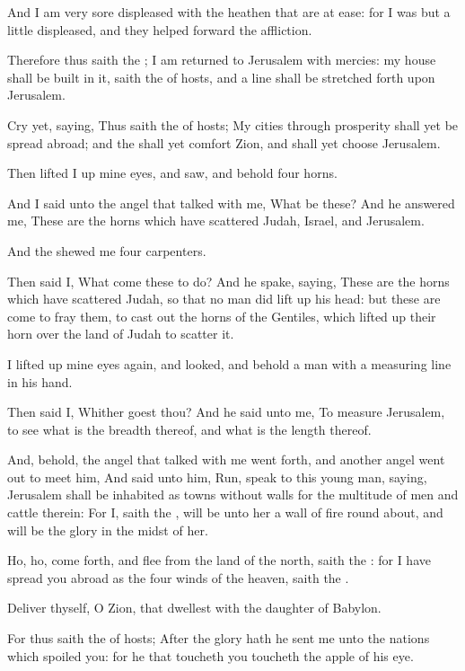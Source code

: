 \Verse And I am very sore displeased with the heathen that are at ease: for I was but a little displeased, and they helped forward the affliction.

\Verse Therefore thus saith the \LORD; I am returned to Jerusalem with mercies: my house shall be built in it, saith the \LORD of hosts, and a line shall be stretched forth upon Jerusalem.

\Verse Cry yet, saying, Thus saith the \LORD of hosts; My cities through prosperity shall yet be spread abroad; and the \LORD shall yet comfort Zion, and shall yet choose Jerusalem.

\Verse Then lifted I up mine eyes, and saw, and behold four horns.

\Verse And I said unto the angel that talked with me, What be these? And he answered me, These are the horns which have scattered Judah, Israel, and Jerusalem.

\Verse And the \LORD shewed me four carpenters.

\Verse Then said I, What come these to do? And he spake, saying, These are the horns which have scattered Judah, so that no man did lift up his head: but these are come to fray them, to cast out the horns of the Gentiles, which lifted up their horn over the land of Judah to scatter it.


\Chapter
\Verse I lifted up mine eyes again, and looked, and behold a man with a measuring line in his hand.

\Verse Then said I, Whither goest thou? And he said unto me, To measure Jerusalem, to see what is the breadth thereof, and what is the length thereof.

\Verse And, behold, the angel that talked with me went forth, and another angel went out to meet him, \Verse And said unto him, Run, speak to this young man, saying, Jerusalem shall be inhabited as towns without walls for the multitude of men and cattle therein: \Verse For I, saith the \LORD, will be unto her a wall of fire round about, and will be the glory in the midst of her.

\Verse Ho, ho, come forth, and flee from the land of the north, saith the \LORD: for I have spread you abroad as the four winds of the heaven, saith the \LORD.

\Verse Deliver thyself, O Zion, that dwellest with the daughter of Babylon.

\Verse For thus saith the \LORD of hosts; After the glory hath he sent me unto the nations which spoiled you: for he that toucheth you toucheth the apple of his eye.


